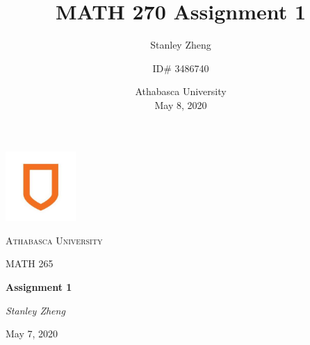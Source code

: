 \documentclass[11pt, letterpaper, twoside, tikz]{article}
\title{MATH 270 Assignment 1}
\date{Athabasca University\\May 8, 2020}
\author{Stanley Zheng\and ID\# 3486740}
\begin{document}
\begin{titlepage}
	\centering
	\vspace*{60px}
	\hspace{0pt}
	\includegraphics[width=0.2\textwidth]{logo}\par\vspace{1cm}
	{\scshape\LARGE Athabasca University \par}
	\vspace{1cm}
	{\scshape\Large MATH 265\par}
	\vspace{1.5cm}
	{\huge\bfseries Assignment 1\par}
	\vspace{2cm}
	{\Large\itshape Stanley Zheng\par}
	\vfill
	{\large May 7, 2020\par}
	\vspace*{50px}
	\hspace{0pt}
\pagebreak
\end{titlepage}
\end{document}
